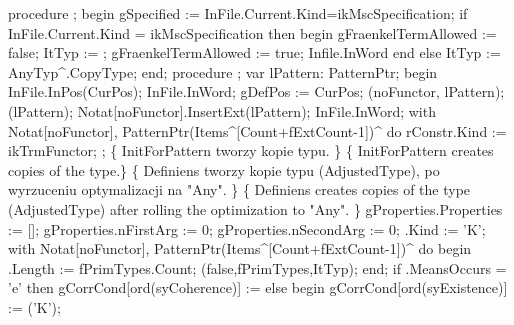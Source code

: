 procedure ;
begin
   gSpecified := InFile.Current.Kind=ikMscSpecification;
   if InFile.Current.Kind = ikMscSpecification then
   begin
      gFraenkelTermAllowed := false;
      ItTyp := ;
      gFraenkelTermAllowed := true;
      Infile.InWord
   end
   else ItTyp := AnyTyp^.CopyType;
end;
\eatline
{}\nwendcode{}\nwdocspar
\nwenddocs{}\endmoddef\nwstartdeflinemarkup{}\nwenddeflinemarkup
procedure ;
var
   lPattern: PatternPtr;
begin
   InFile.InPos(CurPos);
   InFile.InWord;
   gDefPos := CurPos;
   (noFunctor, lPattern);
   (lPattern);
   Notat[noFunctor].InsertExt(lPattern);
   InFile.InWord;
   with Notat[noFunctor], PatternPtr(Items^[Count+fExtCount-1])^ do
                             rConstr.Kind := ikTrmFunctor;
   ;
   \{ InitForPattern tworzy kopie typu. \}
   \{ InitForPattern creates copies of the type.\}
   \{ Definiens tworzy kopie typu (AdjustedType), po wyrzuceniu optymalizacji
     na "Any".
   \}
   \{ Definiens creates copies of the type (AdjustedType) after rolling  
     the optimization to "Any". \}
   gProperties.Properties := [];
   gProperties.nFirstArg := 0;
   gProperties.nSecondArg := 0;
   .Kind := 'K';
   with Notat[noFunctor], PatternPtr(Items^[Count+fExtCount-1])^ do
   begin
      .Length := fPrimTypes.Count;
      (false,fPrimTypes,ItTyp);
   end;
   if .MeansOccurs = 'e' then
      gCorrCond[ord(syCoherence)] := 
   else
   begin
      gCorrCond[ord(syExistence)] := ('K');
